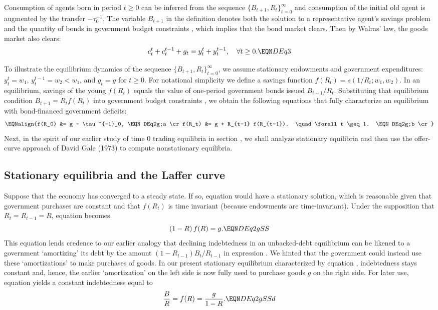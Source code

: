 \noindent
Consumption of agents born in period $t\geq 0$ can be
inferred from the sequence $\{B_{t+1}, R_t\}_{t=0}^\infty$ 
and consumption of the initial old agent is augmented by the
transfer $-\tau^{-1}_0$. The variable $B_{t+1}$ in the definition
denotes both the solution to a representative agent's savings 
problem  and the quantity of bonds in government 
budget constraints , which implies that the 
bond market clears. Then by Walras' law, the goods market also 
clears:
$$c_t^t + c_t^{t-1} + g_t = y_t^t + y_t^{t-1}, 
\quad \forall t \geq 0.        \EQN DEq3
$$


To illustrate the equilibrium dynamics of the sequence
$\{B_{t+1}, R_t\}_{t=0}^\infty$, we assume stationary
endowments and government expenditures: $y^t_t = w_1$,
$y^{t-1}_t=w_2<w_1$, and $g_t=g$ for $t\geq 0$. 
For notational simplicity we define a savings function
$f(R_t)= s(1/R_t; w_1, w_2)$. In an equilibrium, 
savings of the young $f(R_t)$ 
equals the value of one-period government bonds issued
$B_{t+1}/R_t$. Substituting that equilibrium condition
$B_{t+1}=R_t f(R_t)$ into government budget constraints
, we obtain the following equations that
fully characterize an equilibrium with bond-financed 
government deficits:
$$\EQNalign{f(R_0) &= g - \tau^{-1}_0,   \EQN DEq2g;a  \cr
            f(R_t) &= g + R_{t-1} f(R_{t-1}).  \quad \forall t \geq 1. 
                                          \EQN DEq2g;b \cr} $$
Next, in the spirit of our
earlier study of time 0 trading equilibria in 
section , we shall analyze 
stationary equilibria and then use the offer-curve approach 
of David Gale (1973) to compute nonstationary equilibria.



\subsection{Stationary equilibria and the Laffer curve}\label{sec:SSLaffer}
Suppose that the economy has converged to a steady state. 
If so, equation  would have a stationary solution,
which is reasonable given that government 
purchases are constant and that $f(R_t)$ is time
invariant (because endowments are time-invariant).     
Under the supposition that $R_t=R_{t-1}=R$,
equation  becomes
$$ (1-R)\, f(R) = g.        \EQN DEq2gSS $$
This equation lends credence to our earlier analogy that 
declining indebtedness in an unbacked-debt equilibrium 
can be likened to a government `amortizing' its
debt by the amount $(1-R_{t-1})B_t/R_{t-1}$ in 
expression . We hinted that the government 
could instead use these `amortizations' to make 
purchases of goods. In our present stationary 
equilibrium characterized by equation ,
indebtedness stays constant and, hence, the earlier
`amortization' on the left side is now
fully used to purchase goods $g$ on the right side.
For later use, equation  yields a constant 
indebtedness equal to 
$$ {B \over R} = f(R) = {g \over 1-R}.    \EQN DEq2gSSd $$

